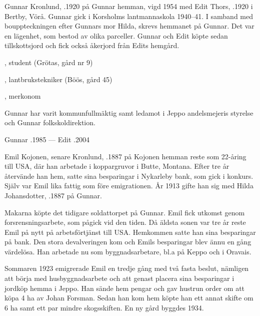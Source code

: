Gunnar Kronlund, .1920 på Gunnar hemman, vigd 1954 med Edit Thors, .1920 i Bertby, Vörå. Gunnar gick i Korsholms lantmannaskola 1940--41. I samband med bouppteckningen efter Gunnars mor Hilda, skrevs hemmanet på Gunnar. Det var en lägenhet, som bestod av olika parceller. Gunnar och Edit köpte sedan tillskottsjord och fick också åkerjord från Edits hemgård.
\begin{jhchildren}
  \item {}, student (Grötas, gård nr 9)
  \item {}, lantbrukstekniker (Böös, gård 45)
  \item {}, merkonom
\end{jhchildren}

Gunnar har varit kommunfullmäktig samt ledamot i Jeppo andelsmejeris styrelse och Gunnar folkskoldirektion.

Gunnar .1985  ---  Edit .2004






Emil Kojonen, senare Kronlund, .1887 på Kojonen hemman reste som 22-åring till USA, där han arbetade i koppargruvor i Butte, Montana. Efter tre år återvände han hem, satte sina besparingar i Nykarleby bank, som gick i konkurs. Själv var Emil lika fattig som före emigrationen. År 1913 gifte han sig med Hilda Johansdotter, .1887 på Gunnar.
\begin{jhchildren}
  \item {}
  \item {}
\end{jhchildren}

Makarna köpte det tidigare soldattorpet på Gunnar. Emil fick utkomst genom forsrensningsarbete, som pågick vid den tiden. Då äldsta sonen var tre år reste Emil på nytt på arbetsförtjänst till USA. Hemkommen satte han sina besparingar på bank. Den stora devalveringen kom och Emils besparingar blev ännu en gång värdelösa. Han arbetade nu som byggnadsarbetare, bl.a på Keppo och i Oravais.

Sommaren 1923 emigrerade Emil en tredje gång med två fasta beslut, nämligen att börja med husbyggnadsarbete och att genast placera sina besparingar i jordköp hemma i Jeppo. Han sände hem pengar och gav hustrun order om att köpa 4 ha av Johan Forsman. Sedan han kom hem köpte han ett annat skifte om 6 ha samt ett par mindre skogsskiften. En ny gård byggdes 1934.

